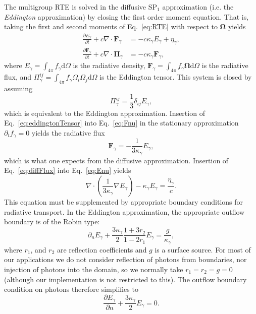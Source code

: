 \documentclass[3p]{elsarticle}
\def\diff{\ensuremath{\text{d}}}
\begin{document}
The multigroup RTE is solved in the diffusive $\text{SP}_1$ approximation (i.e. the \emph{Eddington} approximation) by closing the first order moment equation. That is, taking the first and second moments of Eq.~\eqref{eq:RTE} with respect to $\bm{\Omega}$ yields
\begin{subequations}
  \begin{align}
    \label{eq:Enu}
    \frac{\partial E_\gamma}{\partial t} + c\nabla\cdot\bm{F}_\gamma &= -c\kappa_\gamma E_\gamma + \eta_\gamma, \\
    \label{eq:Fnu}
    \frac{\partial \bm{F}_\gamma}{\partial t} + c\nabla\cdot\bm{\Pi}_\gamma &= -c\kappa_\gamma \bm{F}_\gamma,
  \end{align}
\end{subequations}
where $E_\gamma = \int_{4\pi}f_\gamma \diff\Omega$ is the radiative density, $\bm{F}_\gamma = \int_{4\pi}f_\gamma\bm{\Omega} \diff\Omega$ is the radiative flux, and $\Pi_\gamma^{ij} = \int_{4\pi}f_\gamma\Omega_i\Omega_j \diff\Omega$ is the Eddington tensor. This system is closed by assuming
\begin{equation}
  \label{eq:eddingtonTensor}
  \Pi_\gamma^{ij} = \frac{1}{3}\delta_{ij}E_\gamma,
\end{equation}
which is equivalent to the Eddington approximation. Insertion of Eq.~\eqref{eq:eddingtonTensor} into Eq.~\eqref{eq:Fnu} in the stationary approximation $\partial_tf_\gamma = 0$ yields the radiative flux
\begin{equation}
  \label{eq:diffFlux}
  \bm{F}_\gamma = -\frac{1}{3\kappa_\gamma}E_\gamma,
\end{equation}
which is what one expects from the diffusive approximation. Insertion of Eq.~\eqref{eq:diffFlux} into Eq.~\eqref{eq:Enu} yields
\begin{equation}
  \nabla\cdot\left(\frac{1}{3\kappa_\gamma}\nabla E_\gamma\right) - \kappa_\gamma E_\gamma = \frac{\eta_\gamma}{c}. 
\end{equation}
This equation must be supplemented by appropriate boundary conditions for radiative transport. In the Eddington approximation, the appropriate outflow boundary is of the Robin type:
\begin{equation}
  \partial_nE_\gamma + \frac{3\kappa_\gamma}{2}\frac{1 + 3r_2}{1 - 2r_1}E_\gamma = \frac{g}{\kappa_\gamma},
\end{equation}
where $r_1$, and $r_2$ are reflection coefficients and $g$ is a surface source. For most of our applications we do not consider reflection of photons from boundaries, nor injection of photons into the domain, so we normally take $r_1 = r_2 = g = 0$ (although our implementation is not restricted to this). The outflow boundary condition on photons therefore simplifies to
\begin{equation}
  \frac{\partial E_\gamma}{\partial n} + \frac{3\kappa_\gamma}{2}E_\gamma = 0.
\end{equation}
\end{document}
